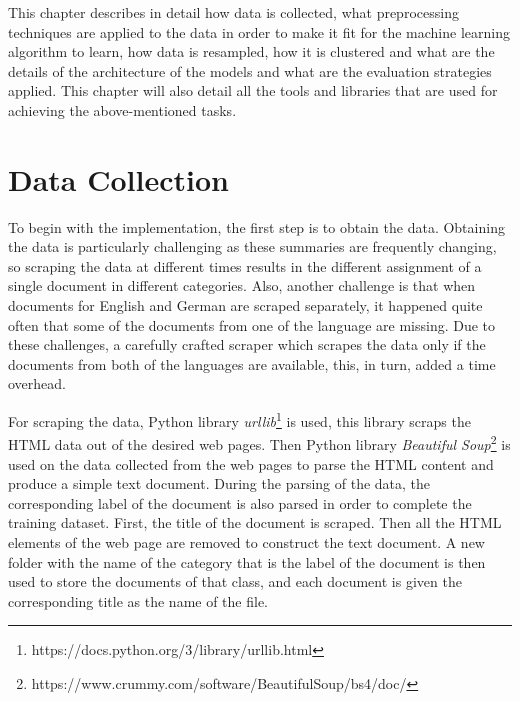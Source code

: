 \label{ch:implementation}

This chapter describes in detail how data is collected, what preprocessing techniques are applied to the data in order to make it fit for the machine learning algorithm to learn, how data is resampled, how it is clustered and what are the details of the architecture of the models and what are the evaluation strategies applied. This chapter will also detail all the tools and libraries that are used for achieving the above-mentioned tasks.

\section{Data Collection}

To begin with the implementation, the first step is to obtain the data. Obtaining the data is particularly challenging as these summaries are frequently changing, so scraping the data at different times results in the different assignment of a single document in different categories. Also, another challenge is that when documents for English and German are scraped separately, it happened quite often that some of the documents from one of the language are missing. Due to these challenges, a carefully crafted scraper which scrapes the data only if the documents from both of the languages are available, this, in turn, added a time overhead.

For scraping the data, Python library \textit{urllib}\footnote{https://docs.python.org/3/library/urllib.html} is used, this library scraps the HTML data out of the desired web pages. Then Python library \textit{Beautiful Soup}\footnote{https://www.crummy.com/software/BeautifulSoup/bs4/doc/} is used on the data collected from the web pages to parse the HTML content and produce a simple text document. During the parsing of the data, the corresponding label of the document is also parsed in order to complete the training dataset. First, the title of the document is scraped. Then all the HTML elements of the web page are removed to construct the text document. A new folder with the name of the category that is the label of the document is then used to store the documents of that class, and each document is given the corresponding title as the name of the file.

